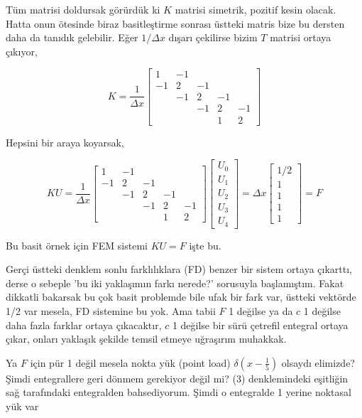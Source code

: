 \documentclass[12pt,fleqn]{article}\usepackage{../../common}
\begin{document}
Tüm matrisi doldursak görürdük ki $K$ matrisi simetrik, pozitif kesin olacak.
Hatta onun ötesinde biraz basitleştirme sonrası üstteki matris bize bu dersten
daha da tanıdık gelebilir. Eğer $1/\Delta x$ dışarı çekilirse bizim $T$ matrisi
ortaya çıkıyor,

$$
K = \frac{1}{\Delta x}
\left[\begin{array}{rrrrr}
1 & -1   &    & \\
-1  & 2  & -1 &  &   \\
    & -1 &  2 & -1 &   \\
    &    & -1 & 2 & -1  \\
    &    &    & 1  & 2 
\end{array}\right]
$$

Hepsini bir araya koyarsak,

$$
KU =
\frac{1}{\Delta x}
\left[\begin{array}{rrrrr}
1 & -1   &    & \\
-1  & 2  & -1 &  &   \\
    & -1 &  2 & -1 &   \\
    &    & -1 & 2 & -1  \\
    &    &    & 1  & 2 
\end{array}\right]
\left[\begin{array}{r}
U_0 \\ U_1 \\ U_2 \\ U_3 \\ U_4
\end{array}\right] =
\Delta x
\left[\begin{array}{r}
1/2 \\ 1 \\ 1 \\ 1 \\ 1
\end{array}\right] = F
$$

Bu basit örnek için FEM sistemi $KU = F$ işte bu.

Gerçi üstteki denklem sonlu farklılıklara (FD) benzer bir sistem ortaya
çıkarttı, derse o sebeple 'bu iki yaklaşımın farkı nerede?' sorusuyla
başlamıştım. Fakat dikkatli bakarsak bu çok basit problemde bile ufak
bir fark var, üstteki vektörde 1/2 var mesela, FD sistemine bu yok.
Ama tabii $F$ 1 değilse ya da $c$ 1 değilse daha fazla farklar ortaya
çıkacaktır, $c$ 1 değilse bir sürü çetrefil entegral ortaya çıkar, onları
yaklaşık şekilde temsil etmeye uğraşırım muhakkak. 

Ya $F$ için pür 1 değil mesela nokta yük (point load) $\delta (x-\frac{1}{5})$
olsaydı elimizde? Şimdi entegrallere geri dönmem gerekiyor değil mi? (3)
denklemindeki eşitliğin sağ tarafındaki entegralden bahsediyorum. Şimdi
o entegralde 1 yerine noktasal yük var
\end{document}

